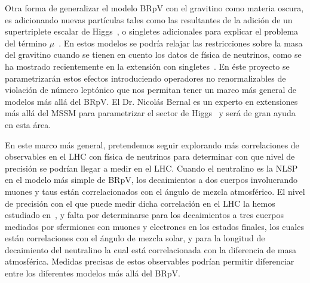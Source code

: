 \begin{bbrpvlhc}
  Otra forma de generalizar el modelo BRpV con el gravitino como
  materia oscura, es adicionando nuevas partículas tales como las
  resultantes de la adición de un supertriplete escalar de
  Higgs~\cite{AristizabalSierra:2003ix}, o singletes adicionales para
  explicar el problema del término
  $\mu$~\cite{LopezFogliani:2005yw}. En estos modelos se podría
  relajar las restricciones sobre la masa del gravitino cuando se
  tienen en cuento los datos de física de neutrinos, como se ha
  mostrado recientemente en la extensión con
  singletes~\cite{GomezVargas:2011ph}. En éste proyecto se
  parametrizarán estos efectos introduciendo operadores no
  renormalizables de violación de número leptónico que nos permitan
  tener un marco más general de modelos más allá del BRpV. El
  Dr. Nicolás Bernal es un experto en extensiones más allá del MSSM
  para parametrizar el sector de
  Higgs~\cite{Bernal:2007uv,Bernal:2009hd} y será de gran ayuda en
  esta área.
\end{bbrpvlhc}

\begin{brpvlhc}
  En este marco más general, pretendemos seguir explorando más
  correlaciones de observables en el LHC con física de neutrinos para
  determinar con que nivel de precisión se podrían llegar a medir en
  el LHC. Cuando el neutralino es la NLSP en el modelo más simple de
  BRpV, los decaimientos a dos cuerpos involucrando muones y taus
  están correlacionados con el ángulo de mezcla atmosférico. El nivel
  de precisión con el que puede medir dicha correlación en el LHC la
  hemos estudiado en~\cite{DeCampos:2010yu}, y falta por determinarse
  para los decaimientos a tres cuerpos mediados por sfermiones con
  muones y electrones en los estados finales, los cuales están
  correlaciones con el ángulo de mezcla solar, y para la longitud de
  decaimiento del neutralino la cual está correlacionada con la
  diferencia de masa atmosférica. Medidas precisas de estos
  observables podrían permitir diferenciar entre los diferentes
  modelos más allá del BRpV.
\end{brpvlhc}

